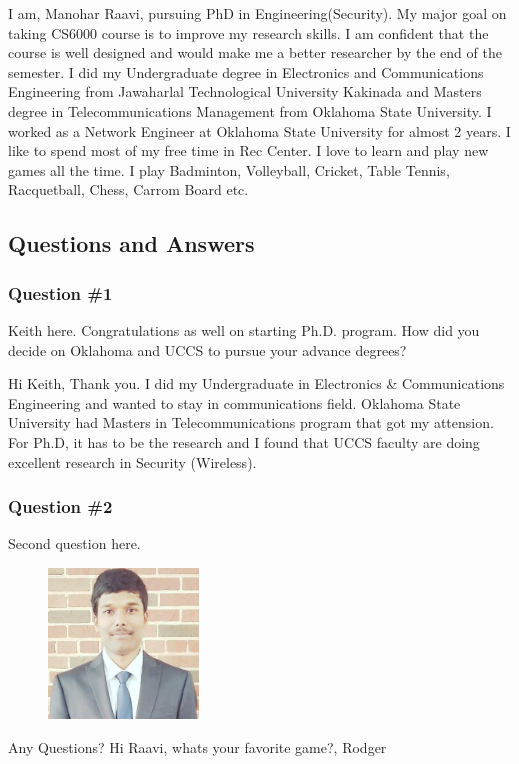 
I am, Manohar Raavi, pursuing PhD in Engineering(Security). My major goal on taking CS6000 course is to improve my research skills. 
I am confident that the course is well designed and would make me a better researcher by the end of the semester.
 I did my Undergraduate degree in Electronics and Communications Engineering from Jawaharlal Technological University Kakinada and Masters degree in Telecommunications Management from Oklahoma State University. I worked as a Network Engineer at Oklahoma State University for almost 2 years. I like to spend most of my free time in Rec Center.
 I love to learn and play new games all the time. I play Badminton, Volleyball, Cricket, Table Tennis, Racquetball, Chess, Carrom Board etc.

\subsection{Questions and Answers}
\subsubsection {Question \#1}
Keith here. Congratulations as well on starting Ph.D. program. How did you decide on Oklahoma and UCCS to pursue your advance degrees?

Hi Keith,
Thank you. I did my Undergraduate in Electronics \& Communications Engineering and wanted to stay in communications field.
Oklahoma State University had Masters in Telecommunications program that got my attension. For Ph.D, it has to be the research and I found that UCCS faculty are doing excellent research in Security (Wireless).



\subsubsection {Question \#2}

Second question here.

\begin{figure}[htp]
    \centering
    \includegraphics[width=4cm]{linkd1}
\end{figure}

Any Questions?
Hi Raavi, whats your favorite game?, Rodger